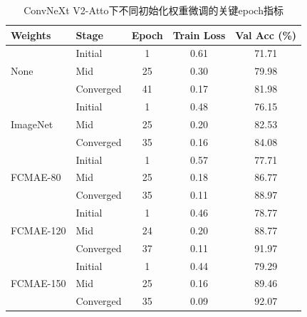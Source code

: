 \begin{table}[H]
    \centering
    \caption{ConvNeXt V2-Atto下不同初始化权重微调的关键epoch指标}
    \label{tab:cp2_finetune_key_epochs_weights}
    \begin{tabular}{l l c c c}
        \toprule
        Weights                    & Stage     & Epoch & Train Loss & Val Acc (\%) \\
        \midrule
        \multirow{3}{*}{None}      & Initial   & 1     & 0.61       & 71.71        \\
                                   & Mid       & 25    & 0.30       & 79.98        \\
                                   & Converged & 41    & 0.17       & 81.98        \\
        \midrule
        \multirow{3}{*}{ImageNet}  & Initial   & 1     & 0.48       & 76.15        \\
                                   & Mid       & 25    & 0.20       & 82.53        \\
                                   & Converged & 35    & 0.16       & 84.08        \\
        \midrule
        \multirow{3}{*}{FCMAE-80}  & Initial   & 1     & 0.57       & 77.71        \\
                                   & Mid       & 25    & 0.18       & 86.77        \\
                                   & Converged & 35    & 0.11       & 88.97        \\
        \midrule
        \multirow{3}{*}{FCMAE-120} & Initial   & 1     & 0.46       & 78.77        \\
                                   & Mid       & 24    & 0.20       & 88.77        \\
                                   & Converged & 37    & 0.11       & 91.97        \\
        \midrule
        \multirow{3}{*}{FCMAE-150} & Initial   & 1     & 0.44       & 79.29        \\
                                   & Mid       & 25    & 0.16       & 89.46        \\
                                   & Converged & 35    & 0.09       & 92.07        \\
        \bottomrule
    \end{tabular}
\end{table}


